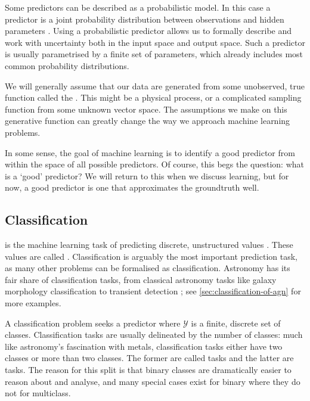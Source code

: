         Some predictors can be described as a probabilistic model. In this case a predictor is a joint probability distribution between observations and hidden parameters \citep{deisenroth_mathematics_2020}. Using a probabilistic predictor allows us to formally describe and work with uncertainty both in the input space and output space. Such a predictor is usually parametrised by a finite set of parameters, which already includes most common probability distributions.

        We will generally assume that our data are generated from some unobserved, true function called the . This might be a physical process, or a complicated sampling function from some unknown vector space. The assumptions we make on this generative function can greatly change the way we approach machine learning problems.

        In some sense, the goal of machine learning is to identify a good predictor from within the space of all possible predictors. Of course, this begs the question: what is a `good' predictor? We will return to this when we discuss learning, but for now, a good predictor is one that approximates the groundtruth well.

    \subsection{Classification}
    \label{sec:classification}

         is the machine learning task of predicting discrete, unstructured values \citep{deisenroth_mathematics_2020}. These values are called . Classification is arguably the most important prediction task, as many other problems can be formalised as classification. Astronomy has its fair share of classification tasks, from classical astronomy tasks like galaxy morphology classification \citep[appearing in machine learning literature as e.g.][]{dieleman15cnn} to transient detection \citep[e.g.][]{scalzo_skymapper_2017}; see \autoref{sec:classification-of-agn} for more examples.

        A classification problem seeks a predictor where $\mathcal Y$ is a finite, discrete set of classes. Classification tasks are usually delineated by the number of classes: much like astronomy's fascination with metals, classification tasks either have two classes or more than two classes. The former are called  tasks and the latter are  tasks. The reason for this split is that binary classes are dramatically easier to reason about and analyse, and many special cases exist for binary where they do not for multiclass.


